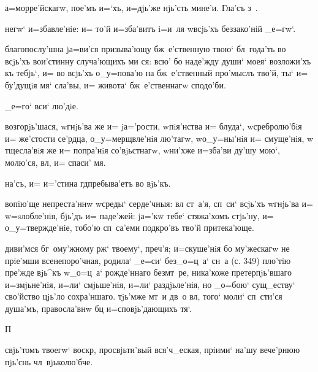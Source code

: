 а=морре'йскагw, пое'мъ и=`хъ, и=дjь'же нjь'сть мине'и. 
Гла'съ з~.%


негw` и=збавле'нiе: и= то'й и=зба'витъ i=и~ля w\т всjь'хъ 
беззако'нiй _е=гw`.

благопослу'шна jа=ви'ся призыва'ющу бж~е'ственную твою` 
бл~года'ть во всjь'хъ вои'стинну случа'ющихъ ми ся: всю' 
бо наде'жду души` моея` возложи'хъ къ тебjь`, и= во 
всjь'хъ о_у=пова'ю на бж~е'ственный про'мыслъ тво'й, ты` 
и= бу'дущiя мя` сла'вы, и= живота` бж~е'ственнагw 
сподо'би.

_е=го` вси` лю'дiе.

возгорjь'шася, w\т гнjь'ва же и= jа='рости, w\т пiя'нства 
и= блуда`, w\т сребролю'бiя и= же'стости се'рдца, 
о_у=мерщвле'нiя лю'тагw, w\т о_у=ны'нiя и= смуще'нiя, w\т 
тщесла'вiя же и= попра'нiя со'вjьстнагw, w\т ни'хже 
и=зба'ви ду'шу мою`, молю'ся, вл, и= спаси' мя.

на'съ, и= и='стина гд пребыва'етъ во вjь'къ.

вопiю'ще непреста'ннw w\т среды` серде'чныя: вл 
ст~а'я, сп~си` всjь'хъ w\т гнjь'ва и= w=sлобле'нiя, 
бjь'дъ и= паде'жей: jа='кw тебе` стяжа'хомъ стjь'ну, и= 
о_у=твержде'нiе, тобо'ю сп~са'еми под\ъ кро'въ тво'й 
притека'юще.

диви'мся бг~ому'жному рж` твоему`, преч'я; 
и=скуше'нiя бо му'жескагw не прiе'мши всенепоро'чная, 
родила` _е=си` без\ъ _о=ц~а` сн~а (с. 349) пло'тiю 
пре'жде вjь^къ w\т _о=ц~а` рожде'ннаго без\ъ мт~ре, 
ника'коже претерпjь'вшаго и=змjьне'нiя, и=ли` смjьше'нiя, 
и=ли` раздjьле'нiя, но _о=бою` сущ_еству` сво'йство 
цjь'ло сохра'ншаго. тjь'мже мт~и дв~о вл, того` 
моли` сп~сти'ся душа'мъ, правосла'внw бц 
и=сповjь'дающихъ тя`.

П%


свjь'томъ твоегw` воскр, просвjьти'вый вся'ч_еская, 
прiими` на'шу вече'рнюю пjь'снь чл~вjьколю'бче.

